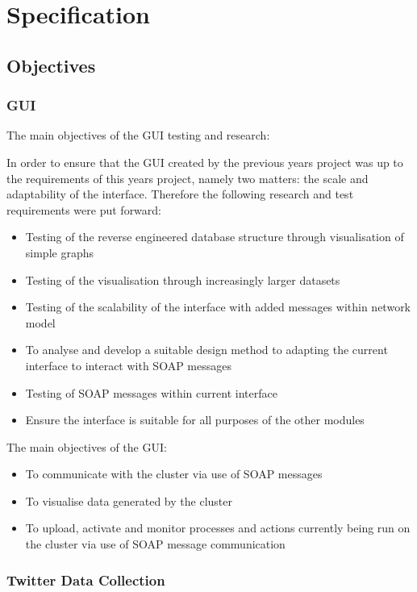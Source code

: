 \chapter{Specification}

\section{Objectives}

\subsection{GUI}

The main objectives of the GUI testing and research:

In order to ensure that the GUI created by the previous years project was up to the requirements of this years project, namely two matters: the scale and adaptability of the interface. Therefore the following research and test requirements were put forward:

\begin{itemize}
\item Testing of the reverse engineered database structure through visualisation of simple graphs
\item Testing of the visualisation through increasingly larger datasets
\item  Testing of the scalability of the interface with added messages within network model
\item To analyse and develop a suitable design method to adapting the current interface to interact with SOAP messages
\item Testing of SOAP messages within current interface
\item Ensure the interface is suitable for all purposes of the other modules
\end{itemize}

The main objectives of the GUI:

\begin{itemize}
\item To communicate with the cluster via use of SOAP messages
\item To visualise data generated by the cluster
\item To upload, activate and monitor processes and actions currently being run on the cluster via use of SOAP message communication
\end{itemize}

\subsection{Twitter Data Collection}

